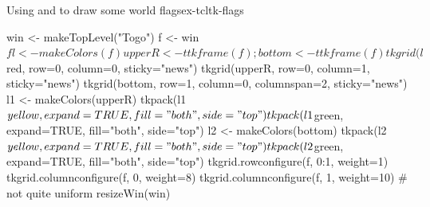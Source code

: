 \begin{example}{Using  and  to draw some world flags}{ex-tcltk-flags}
\begin{Schunk}
\begin{Sinput}
 win <- makeTopLevel("Togo")
 f <- win$f
 l <- makeColors(f)
 upperR <- ttkframe(f); bottom <- ttkframe(f)
 tkgrid(l$red, row=0, column=0, sticky="news")
 tkgrid(upperR, row=0, column=1, sticky="news")
 tkgrid(bottom, row=1, column=0, columnspan=2, sticky="news")
 l1 <- makeColors(upperR)
 tkpack(l1$yellow, expand=TRUE, fill="both", side="top")
 tkpack(l1$green, expand=TRUE, fill="both", side="top")
 l2 <- makeColors(bottom)
 tkpack(l2$yellow, expand=TRUE, fill="both", side="top")
 tkpack(l2$green, expand=TRUE, fill="both", side="top")
 tkgrid.rowconfigure(f, 0:1, weight=1)
 tkgrid.columnconfigure(f, 0, weight=8)
 tkgrid.columnconfigure(f, 1, weight=10)  # not quite uniform
 resizeWin(win)
\end{Sinput}
\end{Schunk}


\end{example}


